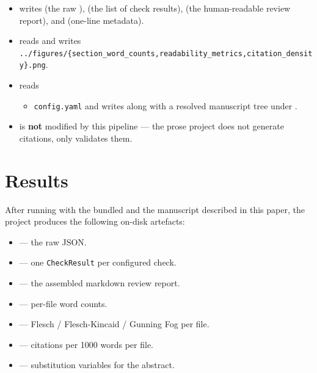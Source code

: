 \documentclass[
]{article}
\providecommand{\tightlist}{%
  \setlength{\itemsep}{0pt}\setlength{\parskip}{0pt}}
\begin{document}
\begin{itemize}
\tightlist
\item
   writes
   (the raw
  ),  (the list of
  check results),  (the human-readable
  review report), and  (one-line
  metadata).
\item
   reads
   and writes
  \texttt{../figures/\{section\_word\_counts,readability\_metrics,citation\_density\}.png}.
\item
   reads

  \begin{itemize}
  \tightlist
  \item
    \texttt{config.yaml} and writes
     along with a
    resolved manuscript tree under .
  \end{itemize}
\item
   is \textbf{not} modified by this
  pipeline --- the prose project does not generate citations, only
  validates them.
\end{itemize}

\newpage

\section{Results}\label{sec:results}

After running  with the bundled
 and the manuscript described in this
paper, the project produces the following on-disk artefacts:

\begin{itemize}
\tightlist
\item
   --- the raw
   JSON.
\item
   --- one \texttt{CheckResult} per
  configured check.
\item
   --- the assembled markdown review
  report.
\item
   --- per-file word
  counts.
\item
   --- Flesch /
  Flesch-Kincaid / Gunning Fog per file.
\item
   --- citations per 1000 words
  per file.
\item
   --- substitution
  variables for the abstract.
\end{itemize}
\end{document}

